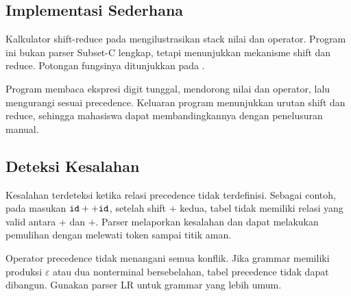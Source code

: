 \subsection{Implementasi Sederhana}

Kalkulator shift-reduce pada  mengilustrasikan
stack nilai dan operator. Program ini bukan parser Subset-C lengkap,
tetapi menunjukkan mekanisme shift dan reduce. Potongan fungsinya
ditunjukkan pada .


Program membaca ekspresi digit tunggal, mendorong nilai dan operator,
lalu mengurangi sesuai precedence. Keluaran program menunjukkan
urutan shift dan reduce, sehingga mahasiswa dapat membandingkannya
dengan penelusuran manual.

\subsection{Deteksi Kesalahan}

Kesalahan terdeteksi ketika relasi precedence tidak terdefinisi.
Sebagai contoh, pada masukan \(\texttt{id} + + \texttt{id}\), setelah
shift \(+\) kedua, tabel tidak memiliki relasi yang valid antara
\(+\) dan \(+\). Parser melaporkan kesalahan dan dapat melakukan
pemulihan dengan melewati token sampai titik aman.

\begin{warningbox}
Operator precedence tidak menangani semua konflik. Jika grammar
memiliki produksi \(\varepsilon\) atau dua nonterminal bersebelahan,
tabel precedence tidak dapat dibangun. Gunakan parser LR untuk
grammar yang lebih umum.
\end{warningbox}
